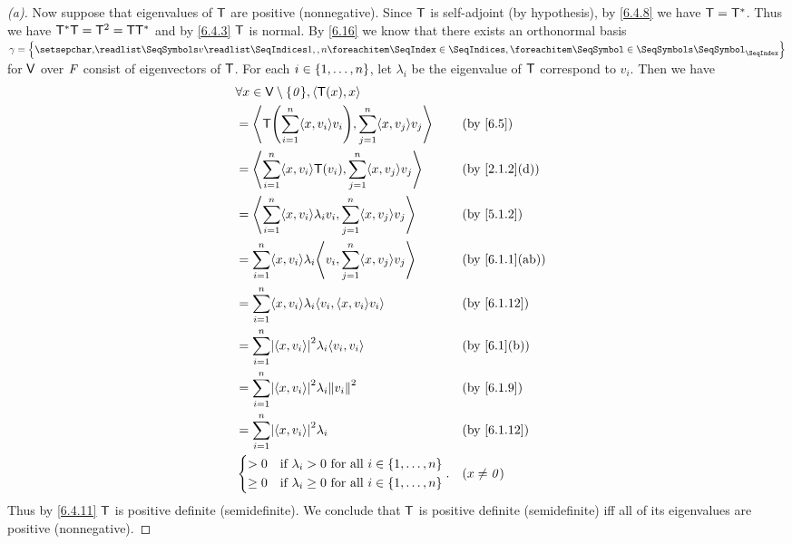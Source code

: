 \begin{proof}[(a)]
	Now suppose that eigenvalues of \(\mathsf{T}\) are positive (nonnegative).
	Since \(\mathsf{T}\) is self-adjoint (by hypothesis), by \cref{6.4.8} we have \(\mathsf{T} = \mathsf{T}^*\).
	Thus we have \(\mathsf{T}^* \mathsf{T} = \mathsf{T}^2 = \mathsf{T} \mathsf{T}^*\) and by \cref{6.4.3} \(\mathsf{T}\) is normal.
	By \cref{6.16} we know that there exists an orthonormal basis \(\gamma = \set{\seq{v}{1,,n}}\) for \(\mathsf{V}\) over \(\mathit{F}\) consist of eigenvectors of \(\mathsf{T}\).
	For each \(i \in \left\lbrace1, \dots, n\right\rbrace\), let \(\lambda_i\) be the eigenvalue of \(\mathsf{T}\) correspond to \(v_i\).
	Then we have
	\begin{align*}
		 & \forall x \in \V \setminus \set{\zv}, \inn{\T(x), x}                                                   \\
		 & = \inn{\T\pa{\sum_{i = 1}^n \inn{x, v_i} v_i}, \sum_{j = 1}^n \inn{x, v_j} v_j}    &  & \by{6.5}       \\
		 & = \inn{\sum_{i = 1}^n \inn{x, v_i} \T(v_i), \sum_{j = 1}^n \inn{x, v_j} v_j}       &  & \by{2.1.2}[d]  \\
		 & = \inn{\sum_{i = 1}^n \inn{x, v_i} \lambda_i v_i, \sum_{j = 1}^n \inn{x, v_j} v_j} &  & \by{5.1.2}     \\
		 & = \sum_{i = 1}^n \inn{x, v_i} \lambda_i \inn{v_i, \sum_{j = 1}^n \inn{x, v_j} v_j} &  & \by{6.1.1}[ab] \\
		 & = \sum_{i = 1}^n \inn{x, v_i} \lambda_i \inn{v_i, \inn{x, v_i} v_i}                &  & \by{6.1.12}    \\
		 & = \sum_{i = 1}^n \abs{\inn{x, v_i}}^2 \lambda_i \inn{v_i, v_i}                     &  & \by{6.1}[b]    \\
		 & = \sum_{i = 1}^n \abs{\inn{x, v_i}}^2 \lambda_i \norm{v_i}^2                       &  & \by{6.1.9}     \\
		 & = \sum_{i = 1}^n \abs{\inn{x, v_i}}^2 \lambda_i                                    &  & \by{6.1.12}    \\
		 & \begin{dcases}
			   > 0    & \text{if } \lambda_i > 0 \text{ for all } i \in \set{1, \dots, n}    \\
			   \geq 0 & \text{if } \lambda_i \geq 0 \text{ for all } i \in \set{1, \dots, n}
		   \end{dcases}.   &  & (x \neq \zv)
	\end{align*}
	Thus by \cref{6.4.11} \(\mathsf{T}\) is positive definite (semidefinite).
	We conclude that \(\mathsf{T}\) is positive definite (semidefinite) iff all of its eigenvalues are positive (nonnegative).
\end{proof}

